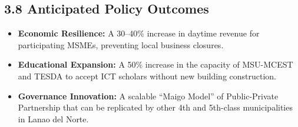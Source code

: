 \subsection*{3.8 Anticipated Policy Outcomes}
\begin{itemize}
    \item \textbf{Economic Resilience:} A 30–40\% increase in daytime revenue for participating MSMEs, preventing local business closures.
    \item \textbf{Educational Expansion:} A 50\% increase in the capacity of MSU-MCEST and TESDA to accept ICT scholars without new building construction.
    \item \textbf{Governance Innovation:} A scalable ``Maigo Model'' of Public-Private Partnership that can be replicated by other 4th and 5th-class municipalities in Lanao del Norte.
\end{itemize}
